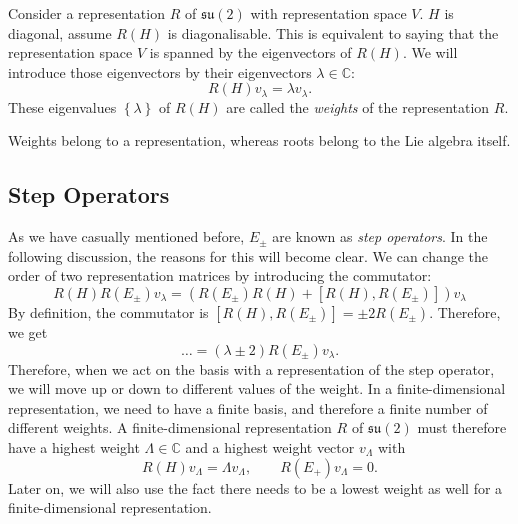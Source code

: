Consider a representation $R$ of $\mathfrak{su}(2)$ with representation space $V$. $H$ is diagonal, assume $R(H)$ is diagonalisable. This is equivalent to saying that the representation space $V$ is spanned by the eigenvectors of $R(H)$.
We will introduce those eigenvectors by their eigenvectors $\lambda \in \mathbb{C}$:
\begin{equation}
  R(H) v_\lambda = \lambda v_\lambda.
\end{equation}
These eigenvalues $\left\{ \lambda \right\}$ of $R(H)$ are called the \emph{weights} of the representation $R$.
\begin{leftbar}
  \begin{remark}
    Weights belong to a representation, whereas roots belong to the Lie algebra itself.
  \end{remark}
\end{leftbar}

\subsection{Step Operators}%
\label{sub:step_operators}

As we have casually mentioned before, $E_{\pm}$ are known as \emph{step operators}. In the following discussion, the reasons for this will become clear.
We can change the order of two representation matrices by introducing the commutator:
\begin{equation}
  R(H) R(E_{\pm}) v_\lambda = (R(E_{\pm}) R(H) + [R(H), R(E_{\pm})]) v_\lambda
\end{equation}
By definition, the commutator is $[R(H), R(E_\pm)] = \pm 2 R(E_{\pm})$.
Therefore, we get
\begin{equation}
  \dots = (\lambda \pm 2) R(E_\pm) v_\lambda.
\end{equation}
Therefore, when we act on the basis with a representation of the step operator, we will move up or down to different values of the weight.
In a finite-dimensional representation, we need to have a finite basis, and therefore a finite number of different weights.
A finite-dimensional representation $R$ of $\mathfrak{su}(2)$ must therefore have a highest weight $\Lambda \in \mathbb{C}$ and a highest weight vector $v_{\Lambda}$ with
\begin{equation}
  R(H) v_{\Lambda} = \Lambda v_{\Lambda}, \qquad R(E_+) v_\Lambda = 0.
\end{equation}
Later on, we will also use the fact there needs to be a lowest weight as well for a finite-dimensional representation.

